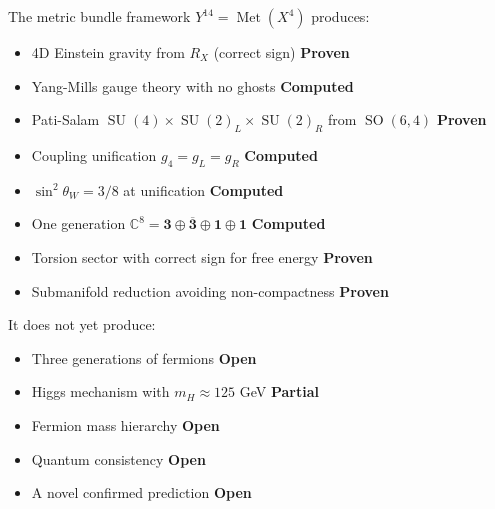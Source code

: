 \documentclass[12pt,a4paper]{article}
\DeclareMathOperator{\SO}{SO}
\DeclareMathOperator{\SU}{SU}
\DeclareMathOperator{\Met}{Met}
\begin{document}
The metric bundle framework $Y^{14} = \Met(X^4)$ produces:
\begin{itemize}
\item 4D Einstein gravity from $R_X$ (correct sign) \hfill \textcolor{proven}{\textbf{Proven}}
\item Yang-Mills gauge theory with no ghosts \hfill \textcolor{computed}{\textbf{Computed}}
\item Pati-Salam $\SU(4)\times\SU(2)_L\times\SU(2)_R$ from $\SO(6,4)$ \hfill \textcolor{proven}{\textbf{Proven}}
\item Coupling unification $g_4 = g_L = g_R$ \hfill \textcolor{computed}{\textbf{Computed}}
\item $\sin^2\theta_W = 3/8$ at unification \hfill \textcolor{computed}{\textbf{Computed}}
\item One generation $\mathbb{C}^8 = \mathbf{3}\oplus\overline{\mathbf{3}}\oplus\mathbf{1}\oplus\mathbf{1}$ \hfill \textcolor{computed}{\textbf{Computed}}
\item Torsion sector with correct sign for free energy \hfill \textcolor{proven}{\textbf{Proven}}
\item Submanifold reduction avoiding non-compactness \hfill \textcolor{proven}{\textbf{Proven}}
\end{itemize}

It does not yet produce:
\begin{itemize}
\item Three generations of fermions \hfill \textcolor{gap}{\textbf{Open}}
\item Higgs mechanism with $m_H \approx 125$ GeV \hfill \textcolor{conjecture}{\textbf{Partial}}
\item Fermion mass hierarchy \hfill \textcolor{gap}{\textbf{Open}}
\item Quantum consistency \hfill \textcolor{gap}{\textbf{Open}}
\item A novel confirmed prediction \hfill \textcolor{gap}{\textbf{Open}}
\end{itemize}

\vspace{12pt}
\begin{center}
\end{center}
\end{document}
